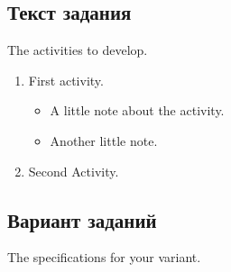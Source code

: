 \begin{center}	
    \section{Текст задания}
\end{center}
The activities to develop.
\begin{enumerate}
    \item First activity\cite{curtis}.
    \begin{itemize}
        \item A little note about the activity.
        \item Another little note\cite{web:lang:stats}.
    \end{itemize}
    \item Second Activity.
\end{enumerate}
\subsection{Вариант заданий}
The specifications for your variant.
\newpage
